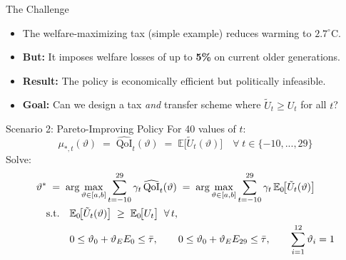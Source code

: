 \documentclass[aspectratio=169,11pt]{beamer}
\begin{document}
\begin{frame}{The Challenge}
\begin{itemize}
    \setlength\itemsep{1.2em}
    \item The welfare-maximizing tax (simple example) reduces warming to $2.7^\circ$C.
    \item \textbf{But:} It imposes welfare losses of up to \textbf{5\%} on current older generations.
    \item \textbf{Result:} The policy is economically efficient but politically infeasible.
    \item \textbf{Goal:} Can we design a tax \textit{and} transfer scheme where $\tilde{U}_t \ge U_t$ for all $t$?
\end{itemize}
\end{frame}

\begin{frame}{Scenario 2: Pareto-Improving Policy}
\footnotesize
For 40 values of $t$:
\begin{equation}
    \mu_{*,t}(\vartheta) \;=\; \widehat{\mathrm{QoI}}_t(\vartheta)
  \;=\;
  \mathbb{E}\!\bigl[\tilde{U}_t(\vartheta)\bigr] \quad \forall \; t \in \{-10,...,29\}
\end{equation}
Solve:
\begin{equation}
\label{eq:opt_pareto_y2}
\begin{aligned}
  &\vartheta^{\ast}
  \;=\;
  \arg\max_{\vartheta\in[a,b]}
  \sum_{t=-10}^{29}\gamma_t\, \widehat{\mathrm{QoI}}_t(\vartheta)
  \;=\;
  \arg\max_{\vartheta\in[a,b]}
  \sum_{t=-10}^{29}\gamma_t\,\mathbb{E}_0\!\bigl[\tilde{U}_t(\vartheta)\bigr] \\
& \quad \text{s.t.} \quad
 \mathbb{E}_0\!\bigl[\tilde{U}_t(\vartheta)\bigr]
  \;\ge\;
  \mathbb{E}_0\!\bigl[U_t\bigr]
  \;\;\forall\,t, \\
& \phantom{\quad \text{s.t.} \quad} 0 \leq \vartheta_0 + \vartheta_E  E_0 \leq \Bar{\tau}, \qquad
 0 \leq \vartheta_0 + \vartheta_E  E_{29} \leq \Bar{\tau},  \qquad
 \sum_{i=1}^{12} \vartheta_i = 1
\end{aligned}
\end{equation}
\end{frame}
\end{document}
